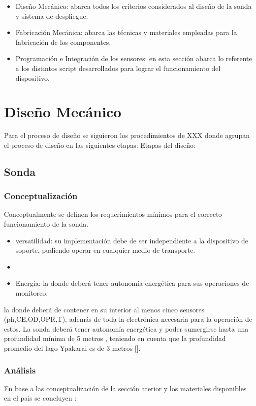 \begin{itemize}
    \item Dise\~no Mec\'anico: abarca todos los criterios considerados al dise\~no de la sonda y sistema de despliegue. 
    \item Fabricaci\'on Mec\'anica: abarca las t\'ecnicas y materiales empleadas para la fabricaci\'on de los componentes.
    \item Programaci\'on e Integraci\'on de los sensores: en esta secci\'on abarca lo referente a los distintos script desarrollados para lograr el funcionamiento del dispositivo.
\end{itemize}

\section{Dise\~no Mec\'anico}
Para el proceso de dise\~no se siguieron los procedimientos de XXX donde agrupan el proceso de dise\~no en las siguientes etapas:
Etapas del dise\~no: 

\subsection{Sonda}
\subsubsection{Conceptualizaci\'on}
Conceptualmente se definen los requerimientos m\'inimos para el correcto funcionamiento de la sonda.
\begin{itemize}
    \item versatilidad: su implementación debe de ser independiente a la dispositivo de soporte, pudiendo operar en cualquier medio de transporte.
    \item 
    \item Energ\'ia: la donde deber\'a tener autonom\'ia energ\'etica para sus operaciones de monitoreo,  
\end{itemize}
la donde deberá de contener en su interior al menos cinco sensores  (ph,CE,OD,OPR,T), adem\'as de toda la electr\'onica necesaria para la operaci\'on de estos. La sonda deber\'a tener autonom\'ia energ\'etica y poder sumergirse hasta una profundidad m\'inima de 5 metros , teniendo en cuenta que la profundidad promedio del lago Ypakarai es de 3 metros [\cite{hidrologiaItaipu}].
   
\subsubsection{An\'alisis}
En base a las conceptualizaci\'on de la secci\'on aterior y los materiales disponibles en el pa\'is se concluyen  :




